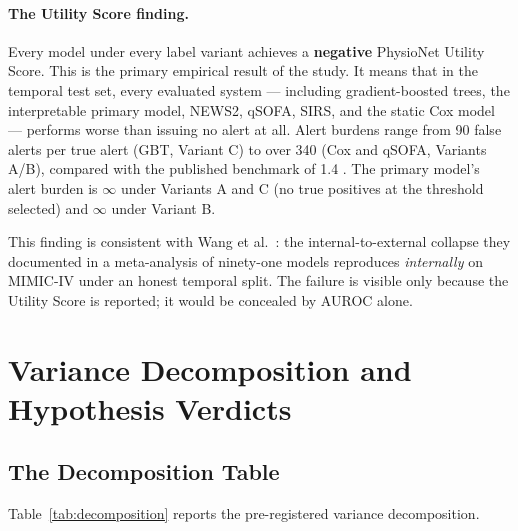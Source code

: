 \paragraph{The Utility Score finding.} Every model under every label variant
achieves a \textbf{negative} PhysioNet Utility Score. This is the primary
empirical result of the study. It means that in the temporal test set, every
evaluated system --- including gradient-boosted trees, the interpretable primary
model, NEWS2, qSOFA, SIRS, and the static Cox model --- performs worse than
issuing no alert at all. Alert burdens range from 90 false alerts per true alert
(GBT, Variant C) to over 340 (Cox and qSOFA, Variants A/B), compared with the
published benchmark of 1.4 \parencite{moor2023review}. The primary model's alert
burden is $\infty$ under Variants A and C (no true positives at the threshold
selected) and $\infty$ under Variant B.

This finding is consistent with Wang et al.\ \parencite{wang2025srpm}: the
internal-to-external collapse they documented in a meta-analysis of ninety-one
models reproduces \textit{internally} on MIMIC-IV under an honest temporal
split. The failure is visible only because the Utility Score is reported; it
would be concealed by AUROC alone.

\section{Variance Decomposition and Hypothesis Verdicts}
\label{sec:decomposition}

\subsection{The Decomposition Table}

Table~\ref{tab:decomposition} reports the pre-registered variance decomposition.

